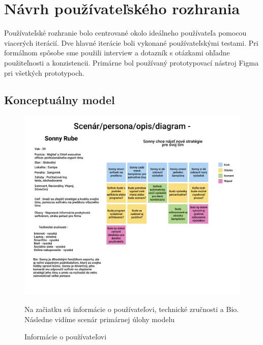 {}
\chapter{Návrh používateľského rozhrania}

\label{summary}

Používateľské rozhranie bolo centrované okolo ideálneho používateľa pomocou viacerých iterácií. Dve hlavné iterácie boli vykonané používateľskými testami. Pri formálnom spôsobe sme použili interview a dotazník s otázkami ohľadne použiteľnosti a konzistencii. Primárne bol používaný prototypovací nástroj Figma pri všetkých prototypoch.



\section*{Konceptuálny model}



\begin{figure}[h!]
	
	\includegraphics[width=.9\textwidth]{figures/scenar}
	
	\centering
	
	\caption{ Informácie o používateľovi \label{scenar}}
	
	Na začiatku sú informácie o používateľovi, technické zručnosti a Bio. Následne vidíme scenár primárnej úlohy modelu
	
\end{figure}



